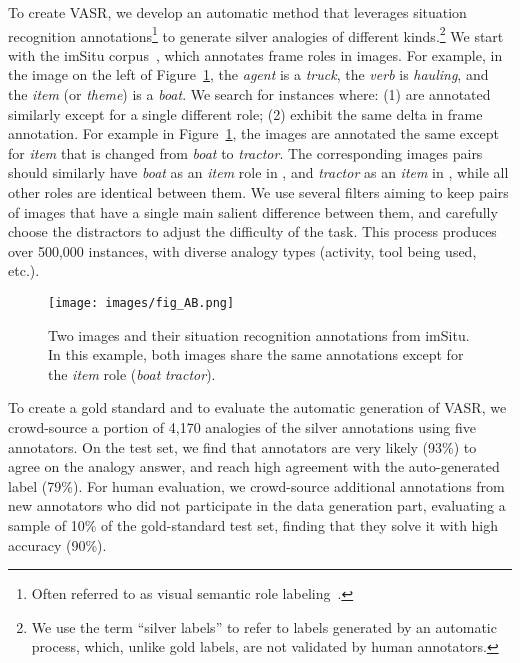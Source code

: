 \documentclass[letterpaper]{article} \usepackage{aaai23}  \usepackage{times}  \usepackage{helvet}  \usepackage{courier}  \usepackage[hyphens]{url}  \usepackage{graphicx} \urlstyle{rm} \def\UrlFont{\rm}  \usepackage{natbib}  \usepackage{caption} \frenchspacing  \setlength{\pdfpagewidth}{8.5in}  \setlength{\pdfpageheight}{11in}  \usepackage{algorithm}
\begin{document}
To create VASR, we develop an automatic method that leverages situation recognition annotations\footnote{Often referred to as visual semantic role labeling~\cite{gupta2015visual}.} to generate silver analogies of different kinds.\footnote{We use the term ``silver labels'' to refer to labels generated by an automatic process, which, unlike gold labels, are not validated by human annotators.} We start with the imSitu corpus~\cite{yatskar2016situation}, which annotates frame roles in images. For example, in the image on the left of Figure~\ref{fig:fig_AB}, the \emph{agent} is a \emph{truck}, the \emph{verb} is \emph{hauling}, and the \emph{item} (or \textit{theme}) is a \emph{boat}. We search for instances  where: (1)  are annotated similarly except for a single different role; (2)  exhibit the same delta in frame annotation. For example in Figure~\ref{fig:fig_AB}, the images are annotated the same except for \emph{item} that is changed from \emph{boat} to \emph{tractor}. The corresponding  images pairs should similarly have \emph{boat} as an \emph{item} role in , and \emph{tractor} as an \emph{item} in , while all other roles are identical between them. We use several filters aiming to keep pairs of images that have a single main salient difference between them, and carefully choose the distractors to adjust the difficulty of the task.
This process produces over 500,000 instances, with diverse analogy types (activity, tool being used, etc.).


\begin{figure}[!tb]
\centering
\newcommand{\figlen}[0]{\columnwidth}
    \texttt{[image: images/fig\_AB.png]}\\
    \caption{Two images and their situation recognition annotations from imSitu. In this example, both images share the same annotations except for the \emph{item} role (\emph{boat}  \emph{tractor}).}
    \label{fig:fig_AB}
\end{figure}

To create a gold standard and to evaluate the automatic generation of VASR, we crowd-source a portion of 4,170 analogies of the silver annotations using five annotators. On the test set, we find that annotators are very likely (93\%) to agree on the analogy answer, and reach high agreement with the auto-generated label (79\%). For human evaluation, we crowd-source additional annotations from new annotators who did not participate in the data generation part, evaluating a sample of 10\% of the gold-standard test set, finding that they solve it with high accuracy (90\%).
\end{document}

